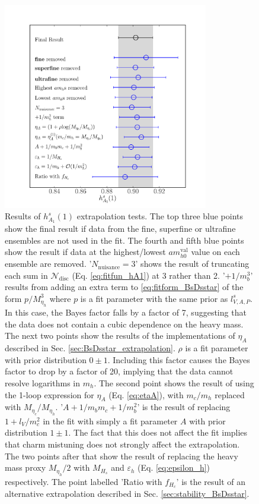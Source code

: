 \begin{figure}%
  \begin{center}
  \hspace{-18pt}
  \includegraphics[width=0.8\textwidth]{images/BsDsstar/hA1vsmh_fittests.pdf}
  
  \caption{Results of $h_{A_1}^s(1)$ extrapolation tests. The top three blue points show the final result if data from the fine, superfine or ultrafine ensembles are not used in the fit.
    The fourth and fifth blue points show the result if data at the highest/lowest $am_{h0}^{\text{val}}$ value on each ensemble are removed.
    '$N_{\text{nuisance}}=3$' shows the result of truncating each sum in $\mathcal{N}_{\text{disc}}$ (Eq. \eqref{eq:fitfun_hA1}) at 3 rather than 2.
    '$+1/m_b^3$' results from adding an extra term to \eqref{eq:fitform_BsDsstar} of the form $p/M_{\eta_h}^3$ where $p$ is a fit parameter with the same prior as $l_{V,A,P}^s$. In this case, the Bayes factor falls by a factor of 7, suggesting that the data does not contain a cubic dependence on the heavy mass.
    The next two points show the results of the implementations of $\eta_A$ described in Sec. \ref{sec:BsDsstar_extrapolation}. $\rho$ is a fit parameter with prior distribution $0\pm 1$. Including this factor causes the Bayes factor to drop by a factor of 20, implying that the data cannot resolve logarithms in $m_h$. The second point shows the result of using the 1-loop expression for $\eta_A$ (Eq. \eqref{eq:etaA}), with $m_c/m_h$ replaced with $M_{\eta_c}/M_{\eta_h}$.
    '$A+1/m_bm_c+1/m_b^2$' is the result of replacing $1+l_V/m_c^2$ in the fit with simply a fit parameter $A$ with prior distribution $1\pm 1$. The fact that this does not affect the fit implies that charm mistuning does not strongly affect the extrapolation.
    The two points after that show the result of replacing the heavy mass proxy $M_{\eta_h}/2$ with $M_{H_s}$ and $\varepsilon_h$ (Eq. \eqref{eq:epsilon_h}) respectively.
    The point labelled 'Ratio with $f_{H_c}$' is the result of an alternative extrapolation described in Sec. \ref{sec:stability_BsDsstar}.  \label{fig:fittests_hA1}}
    \end{center}
\end{figure}


